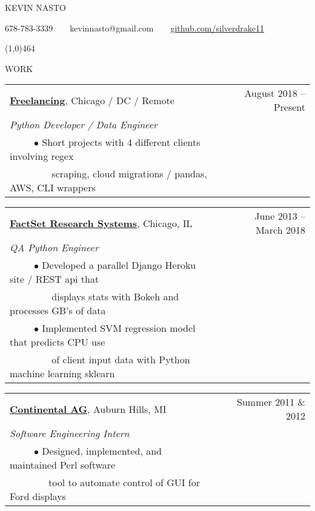 \documentclass[11pt]{article}
\begin{document}
{\LARGE KEVIN NASTO}

678-78\vphantom{x}3-3339~~\textbullet~~kevin\vphantom{x}nast\vphantom{x}o@g\vphantom{x}mail.com~~\textbullet~~\href{https://github.com/silverdrake11/kevinnasto-cv/blob/master/resume.tex}{github.com/silverdrake11}

\line(1,0){464}
\vspace{.8cm}


{WORK}
\vspace{0.4cm}

\begin{tabularx}{\linewidth}{l X r}
\textbf{\href{https://www.upwork.com/o/profiles/users/_~0146e5e5e6eefb0f2a/}{Freelancing}}, Chicago / DC / Remote & & August 2018 -- Present \\
\emph{Python Developer / Data Engineer} \\
~~~~~$\bullet$ Short projects with 4 different clients involving regex \\
~~~~~~~~ scraping, cloud migrations / pandas, AWS, CLI wrappers\\
\end{tabularx}

\vspace{0.4cm}

\begin{tabularx}{\linewidth}{l X r}
\textbf{\href{https://www.factset.com/}{FactSet Research Systems}}, Chicago, IL & & June 2013 -- March 2018 \\
\emph{QA Python Engineer} \\
~~~~~$\bullet$ Developed a parallel Django Heroku site / REST api that\\
~~~~~~~~ displays stats with Bokeh and processes GB's of data \\
~~~~~$\bullet$ Implemented SVM regression model that predicts CPU use \\
~~~~~~~~ of client input data with Python machine learning sklearn\\
\end{tabularx}

\vspace{0.4cm}

\begin{tabularx}{\linewidth}{l X r}
\textbf{\href{https://www.continental-corporation.com/en}{Continental AG}}, Auburn Hills, MI & & Summer 2011 \& 2012 \\
\emph{Software Engineering Intern} \\
~~~~~$\bullet$ Designed, implemented, and maintained Perl software \\
~~~~~~~~tool to automate control of GUI for Ford displays\\
\end{tabularx}
\end{document}
